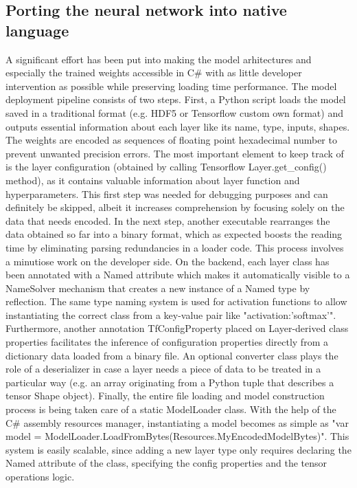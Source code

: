 \subsection{Porting the neural network into native language}
\label{subsec:ch6sec4subsec1}

A significant effort has been put into making the model arhitectures and especially the trained weights accessible in C\# with as little developer intervention as possible while preserving loading time performance. The model deployment pipeline consists of two steps. First, a Python script loads the model saved in a traditional format (e.g. HDF5 or Tensorflow custom own format) and outputs essential information about each layer like its name, type, inputs, shapes. The weights are encoded as sequences of floating point hexadecimal number to prevent unwanted precision errors. The most important element to keep track of is the layer configuration (obtained by calling Tensorflow Layer.get\_config() method), as it contains valuable information about layer function and hyperparameters. This first step was needed for debugging purposes and can definitely be skipped, albeit it increases comprehension by focusing solely on the data that needs encoded. In the next step, another executable rearranges the data obtained so far into a binary format, which as expected boosts the reading time by eliminating parsing redundancies in a loader code. This process involves a minutiose work on the developer side. On the backend, each layer class has been annotated with a Named attribute which makes it automatically visible to a NameSolver mechanism that creates a new instance of a Named type by reflection. The same type naming system is used for activation functions to allow instantiating the correct class from a key-value pair like "activation:'softmax'". Furthermore, another annotation TfConfigProperty placed on Layer-derived class properties facilitates the inference of configuration properties directly from a dictionary data loaded from a binary file. An optional converter class plays the role of a deserializer in case a layer needs a piece of data to be treated in a particular way (e.g. an array originating from a Python tuple that describes a tensor Shape object). Finally, the entire file loading and model construction process is being taken care of a static ModelLoader class. With the help of the C\# assembly resources manager, instantiating a model becomes as simple as "var model = ModelLoader.LoadFromBytes(Resources.MyEncodedModelBytes)". This system is easily scalable, since adding a new layer type only requires declaring the Named attribute of the class, specifying the config properties and the tensor operations logic.

